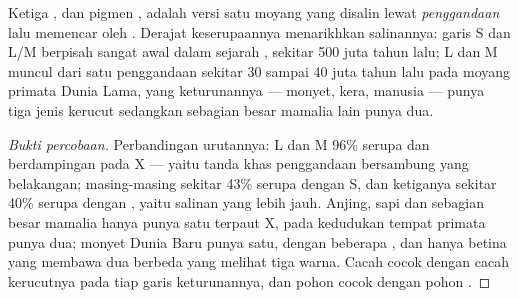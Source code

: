 \begin{proposition}\label{prop:g11:the-eye:family}
Ketiga  , dan  pigmen , adalah versi satu
 moyang yang disalin lewat \emph{penggandaan} lalu memencar oleh
. Derajat keserupaannya menarikhkan salinannya: garis S dan L/M
berpisah sangat awal dalam sejarah , sekitar 500 juta tahun
lalu;  L dan M muncul dari satu penggandaan sekitar 30 sampai 40
juta tahun lalu pada moyang primata Dunia Lama, yang keturunannya ---
monyet, kera, manusia --- punya tiga jenis kerucut sedangkan sebagian
besar mamalia lain punya dua.
\end{proposition}
\begin{proof}[Bukti percobaan]
Perbandingan urutannya:  L dan M 96\% serupa dan berdampingan pada
 X --- yaitu tanda khas penggandaan bersambung yang belakangan;
masing-masing sekitar 43\% serupa dengan  S, dan ketiganya sekitar
40\% serupa dengan   , yaitu salinan yang lebih
jauh. Anjing, sapi dan sebagian besar mamalia hanya punya satu 
 terpaut X, pada kedudukan tempat primata punya dua; monyet Dunia
Baru punya satu, dengan beberapa , dan hanya betina yang membawa
dua  berbeda yang melihat tiga warna. Cacah  cocok dengan
cacah kerucutnya pada tiap garis keturunannya, dan pohon  cocok
dengan pohon .
\end{proof}

